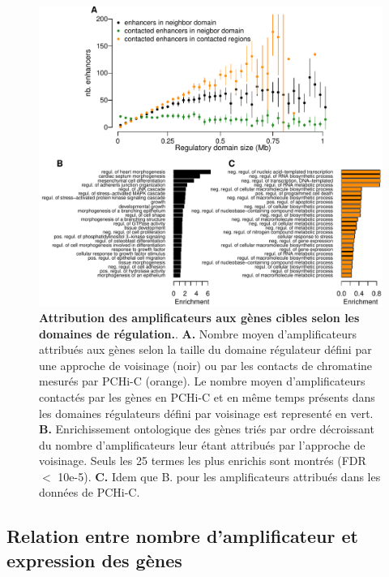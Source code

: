 \begin{figure}[hbt!]
 \centering
 \includegraphics[width=1\textwidth, page=1]{figures/chap2/chap2-fig6.pdf}
 \caption[Attribution des \glspl{amplificateur} aux gènes cibles selon les domaines de régulation.]{
 \textbf{Attribution des \glspl{amplificateur} aux gènes cibles selon les domaines de régulation.}.
 \textbf{A.} Nombre moyen d'\glspl{amplificateur} attribués aux gènes selon la taille du domaine régulateur défini par une approche de voisinage (noir) ou par les contacts de chromatine mesurés par \gls{PCHi-C} (orange). Le nombre moyen d'\glspl{amplificateur} contactés par les gènes en \gls{PCHi-C} et en même temps présents dans les domaines régulateurs défini par voisinage est representé en vert. 
 \textbf{B.} Enrichissement ontologique des gènes triés par ordre décroissant du nombre d'\glspl{amplificateur} leur étant attribués par l'approche de voisinage. Seuls les 25 termes les plus enrichis sont montrés (FDR $<$ 10e-5).
 \textbf{C.} Idem que B. pour les \glspl{amplificateur} attribués dans les données de \gls{PCHi-C}.\\
 }
 \label{fig:chap2-fig6}
\end{figure}

\subsection{Relation entre nombre d’amplificateur et expression des gènes}
\label{subsec:complexite-expression}

